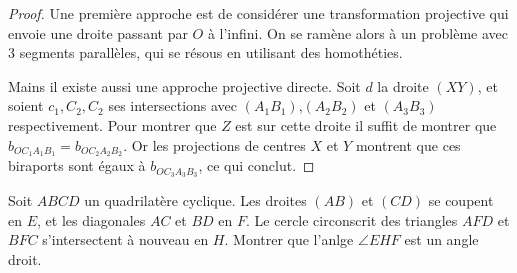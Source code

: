 \begin{proof}

Une première approche est de considérer une transformation projective qui envoie une droite passant par $O$ à l'infini. On se ramène alors à un problème avec $3$ segments parallèles, qui se résous en utilisant des homothéties.

\medskip

Mains il existe aussi une approche projective directe. Soit $d$ la droite $(XY)$, et soient $c_1,C_2,C_2$ ses intersections avec $(A_1B_1)$,$(A_2B_2)$ et $(A_3B_3)$ respectivement. Pour montrer que $Z$ est sur cette droite il suffit de montrer que $b_{OC_1A_1B_1}=b_{OC_2A_2B_2}$. Or les projections de centres $X$ et $Y$ montrent que ces biraports sont égaux à $b_{OC_3A_3B_3}$, ce qui conclut.
\end{proof}

\begin{exo}%
Soit $ABCD$ un quadrilatère cyclique. Les droites $(AB)$ et $(CD)$ se coupent en $E$, et les diagonales $AC$ et $BD$ en $F$. Le cercle circonscrit des triangles $AFD$ et $BFC$ s'intersectent à nouveau en $H$. Montrer que l'anlge $\angle EHF$ est un angle droit.
\end{exo}

